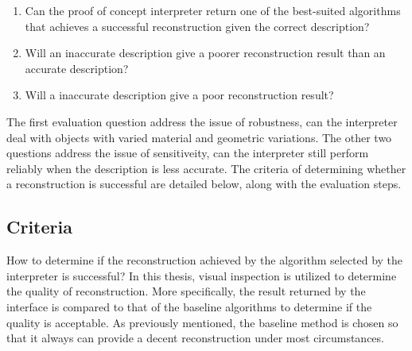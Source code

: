 \begin{enumerate}
\item Can the proof of concept interpreter return one of the best-suited algorithms that achieves a successful reconstruction given the correct description?
\item Will an inaccurate description give a poorer reconstruction result than an accurate description?
\item Will a inaccurate description give a poor reconstruction result?
\end{enumerate}
The first evaluation question address the issue of robustness, \ie can the interpreter deal with objects with varied material and geometric variations. The other two questions address the issue of sensitiveity, \ie can the interpreter still perform reliably when the description is less accurate. The criteria of determining whether a reconstruction is successful are detailed below, along with the evaluation steps.

\subsection{Criteria}
How to determine if the reconstruction achieved by the algorithm selected by the interpreter is successful? In this thesis, visual inspection is utilized to determine the quality of reconstruction. More specifically, the result returned by the interface is compared to that of the baseline algorithms to determine if the quality is acceptable. As previously mentioned, the baseline method is chosen so that it always can provide a decent reconstruction under most circumstances.

